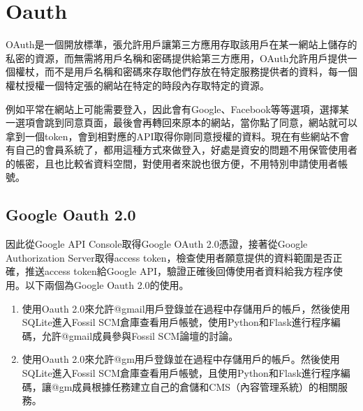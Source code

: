 \chapter{Oauth}
\renewcommand{\baselinestretch}{10} %
\par
\renewcommand{\baselinestretch}{1} %
\twelve OAuth是一個開放標準，張允許用戶讓第三方應用存取該用戶在某一網站上儲存的私密的資源，而無需將用戶名稱和密碼提供給第三方應用，OAuth允許用戶提供一個權杖，而不是用戶名稱和密碼來存取他們存放在特定服務提供者的資料，每一個權杖授權一個特定張的網站在特定的時段內存取特定的資源。\\
\par
\twelve 例如平常在網站上可能需要登入，因此會有Google、Facebook等等選項，選擇某一選項會跳到同意頁面，最後會再轉回來原本的網站，當你點了同意，網站就可以拿到一個token，會到相對應的API取得你剛同意授權的資料。現在有些網站不會有自己的會員系統了，都用這種方式來做登入，好處是資安的問題不用保管使用者的帳密，且也比較省資料空間，對使用者來說也很方便，不用特別申請使用者帳號。

\renewcommand{\baselinestretch}{20} %
\section{Google Oauth 2.0}
\par
\renewcommand{\baselinestretch}{1} %
\twelve 因此從Google API Console取得Google OAuth 2.0憑證，接著從Google Authorization Server取得access token，檢查使用者願意提供的資料範圍是否正確，推送access token給Google API，驗證正確後回傳使用者資料給我方程序使用。以下兩個為Google Oauth 2.0的使用。
\begin{enumerate}
\item 使用Oauth 2.0來允許@gmail用戶登錄並在過程中存儲用戶的帳戶，然後使用SQLite進入Fossil SCM倉庫查看用戶帳號，使用Python和Flask進行程序編碼，允許@gmail成員參與Fossil SCM論壇的討論。
\item 使用Oauth 2.0來允許@gm用戶登錄並在過程中存儲用戶的帳戶。然後使用SQLite進入Fossil SCM倉庫查看用戶帳號，且使用Python和Flask進行程序編碼，讓@gm成員根據任務建立自己的倉儲和CMS（內容管理系統）的相關服務。
\end{enumerate}
\par